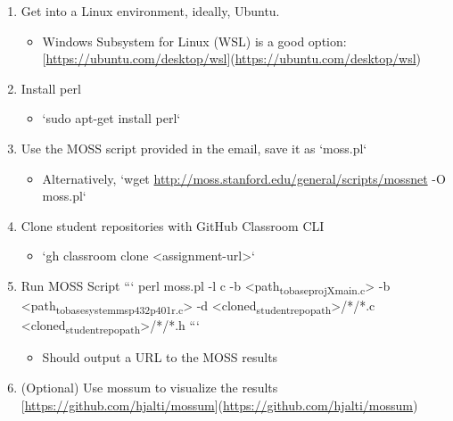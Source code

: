 \documentclass[11pt]{article}
\begin{document}
\begin{enumerate}
\item Get into a Linux environment, ideally, Ubuntu.
\begin{itemize}
\item Windows Subsystem for Linux (WSL) is a good option: [\url{https://ubuntu.com/desktop/wsl}](\url{https://ubuntu.com/desktop/wsl})
\end{itemize}

\item Install perl
\begin{itemize}
\item `sudo apt-get install perl`
\end{itemize}

\item Use the MOSS script provided in the email, save it as `moss.pl`
\begin{itemize}
\item Alternatively, `wget \url{http://moss.stanford.edu/general/scripts/mossnet} -O moss.pl`
\end{itemize}

\item Clone student repositories with GitHub Classroom CLI
\begin{itemize}
\item `gh classroom clone <assignment-url>`
\end{itemize}

\item Run MOSS Script
```
perl moss.pl -l c -b <path\textsubscript{to}\textsubscript{base}\textsubscript{projX}\textsubscript{main.c}> -b <path\textsubscript{to}\textsubscript{base}\textsubscript{system}\textsubscript{msp432p401r.c}> -d <cloned\textsubscript{student}\textsubscript{repo}\textsubscript{path}>/*/*.c <cloned\textsubscript{student}\textsubscript{repo}\textsubscript{path}>/*/*.h
```
\begin{itemize}
\item Should output a URL to the MOSS results
\end{itemize}

\item (Optional) Use mossum to visualize the results [\url{https://github.com/hjalti/mossum}](\url{https://github.com/hjalti/mossum})
\end{enumerate}
\end{document}
